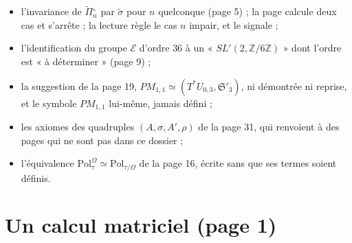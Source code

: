 \documentclass[11pt,a4paper]{article}
\begin{document}
\begin{itemize}
\item l'invariance de $\widetilde{\Pi}{}^{\circ}_n$ par $\tilde\sigma$ pour $n$
quelconque (page 5) ; la page calcule deux cas et s'arrête ; la lecture règle le
cas $n$ impair, et le signale ;
\item l'identification du groupe $\mathcal{E}$ d'ordre $36$ à un
« $SL'(2, \mathbb{Z}/6\mathbb{Z})$ » dont l'ordre est « à déterminer » (page 9) ;
\item la suggestion de la page 19, $PM_{1,1} \simeq (T^{*}U_{0,3},
\mathfrak{S}'_3)$, ni démontrée ni reprise, et le symbole $PM_{1,1}$ lui-même,
jamais défini ;
\item les axiomes des quadruples $(A, \sigma, A', \rho)$ de la page 31, qui
renvoient à des pages qui ne sont pas dans ce dossier ;
\item l'équivalence $\mathrm{Pol}_\tau^{\Omega} \simeq \mathrm{Pol}_{\tau/\Omega}$
de la page 16, écrite sans que ses termes soient définis.
\end{itemize}

\section*{Un calcul matriciel (page 1)}
\end{document}
